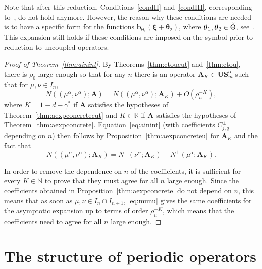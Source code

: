 \documentclass[AHL,Unicode,longabstracts,published]{cedram}
\newcommand{\R}{\mathbb R}
\newcommand{\N}{\mathbb N}
\newcommand{\btheta}{\boldsymbol \theta}
\newcommand{\bxi}{\boldsymbol \xi}
\newcommand{\BA}{\mathbf A}
\newcommand{\BS}{\mathbf S}
\newcommand{\BU}{\mathbf U}
\newcommand{\bbb}{\mathbf b}
\newcommand{\bigo}[1]{O\left(#1 \right)}
\let\oldtilde\tilde
\renewcommand*{\tilde}[1]{\mathchoice{\widetilde{#1}}{\widetilde{#1}}{\oldtilde{#1}}{\oldtilde{#1}}}
\begin{document}
\begin{rema}
Note that after this reduction, Conditions~\ref{condII} and~\ref{condIII}, corresponding to~\cite[Equation 2.4 and Condition B]{MorParSht2014}, do not hold anymore. However, the reason why these conditions are needed is to have a specific form for the functions $\bbb_{\btheta_1}(\bxi + \btheta_2)$, where $\btheta_1,\btheta_2 \in \tilde
\Theta$, see~\cite[Equation 10.5]{MorParSht2014}. This expansion still holds if these conditions are imposed on the symbol prior to reduction to uncoupled operators.
\end{rema}



\begin{proof}[Proof of Theorem~\ref{thm:ainint}]
By Theorems~\ref{thm:ctoucut} and~\ref{thm:ctou}, there is $\rho_0$ large enough so that for any $n$ there is an operator $\BA_K \in \BU\BS_m^\alpha$ such that for $\mu,\nu \in I_n$,
\begin{equation}
N((\mu^\alpha,\nu^\alpha);\BA) = N((\mu^\alpha,\nu^\alpha);\BA_K) +
\bigo{\rho_n^{-K}},
\end{equation}
where $K = 1- d - \gamma^*$ if $\BA$ satisfies the hypotheses of Theorem~\ref{thm:aexpconcretecut} and $K \in \R$ if $\BA$ satisfies the hypotheses of Theorem~\ref{thm:aexpconcrete}. Equation~\eqref{eq:ainint} (with coefficients $C^\pm_{j,q}$ depending on $n$) then follows by Proposition~\ref{thm:aexpconcreteu} for $\BA_K$ and the fact that
\begin{equation}\label{eq:munu}
N((\mu^\alpha,\nu^\alpha);\BA_K) = N^+(\nu^\alpha;\BA_K) - N^+(\mu^\alpha;\BA_K).
\end{equation}

In order to remove the dependence on $n$ of the coefficients, it is sufficient for every $K \in \N$ to prove that they must agree for all $n$ large enough. Since the coefficients obtained in Proposition~\ref{thm:aexpconcrete} do not depend on $n$, this means that as soon as $\mu, \nu \in I_{n} \cap I_{n+1}$, \eqref{eq:munu} gives the same coefficients for the asymptotic expansion up to terms of order $\rho_n^{-K}$, which means that the coefficients need to agree for all $n$ large enough.
\end{proof}



\section{The structure of periodic operators}\label{sec:periodic}
\end{document}
